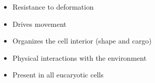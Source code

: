 \begin{itemize}
\item Resistance to deformation
\item Drives movement
\item Organizes the cell interior (shape and cargo)
\item Physical interactions with the environment
\item Present in all eucaryotic cells
\end{itemize}
